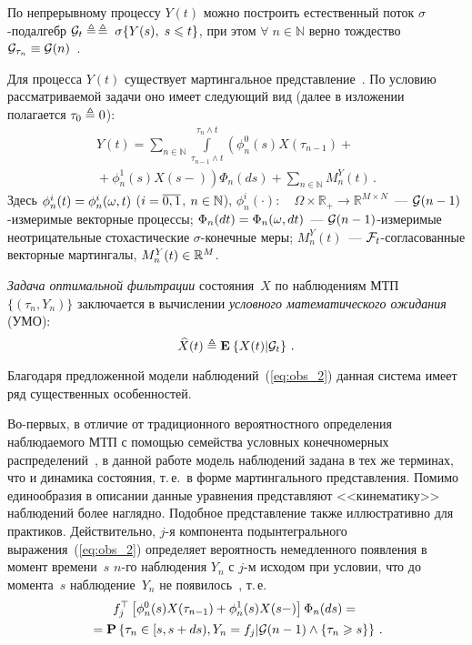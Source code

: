 \begin{multicols}{2}
  По непрерывному процессу $Y(t)$ можно построить естественный поток
  $\sigma$-под\-алгебр ${\mathcal G}_t \triangleq$\linebreak $\ebd\;\sigma\{Y(s), \; s \hm\leqslant t\}$,
  при этом $\forall \; n \in \mathbb{N}$ верно тож\-де\-ст\-во ${\mathcal G}_{\tau_n}
  \equiv {\mathcal G}(n)$~\cite{JSh_94}.

 Для процесса $Y(t)$ существует мартингальное представление~\cite{El_86}.
 По условию рассматриваемой задачи оно имеет следующий вид (далее в изложении
 полагается $\tau_0\hm \ebd 0$):
 \begin{multline}
 Y(t) = \sum\limits_{n \in \mathbb{N}}\int\limits_{\tau_{n-1} \wedge t}^{\tau_{n}
 \wedge t}  \left(
 \phi^0_{n}(s)X(\tau_{n-1})+{}\right.\\
\left. {}+\phi^1_{n}(s)X(s-)
 \right)\Phi_{n}(ds)
 +\sum\limits_{n \in \mathbb{N}}M^Y_n(t)\,.
 \label{eq:obs_2}
 \end{multline}
 Здесь
 $\phi^i_{n}(t)\hm=\phi^i_{n}(\omega,t)$ ($i\hm=\overline{0,1}$, $n \hm
  \in \mathbb{N}$), $\phi^i_{n}(\cdot): \quad \Omega \times \mathbb{R}_+
  \to \mathbb{R}^{M \times N}$~--- ${\mathcal G}(n-1)$-из\-ме\-ри\-мые векторные процессы;
$\Phi_{n}(dt)\hm=\Phi_{n}(\omega,dt)$~--- ${\mathcal G}(n-1)$-из\-ме\-ри\-мые
  не\-от\-ри\-ца\-тель\-ные стохастические $\sigma$-ко\-неч\-ные меры;
$M^Y_n(t)$~--- ${\mathcal F}_t$-со\-гла\-со\-ван\-ные
  векторные мартингалы, $M^Y_n(t) \hm\in \mathbb{R}^{M}$.

\textit{Задача оптимальной фильтрации} состояния~$X$ по наблюдениям
МТП $\{(\tau_n,Y_n)\}$ заключается в вычислении \textit{условного математического
ожидания} (УМО):
 $$
 \widehat{X}(t) \triangleq \mathbf{E}_{  }\left\{ \mathop{X(t)|{\mathcal G}_t} \right\}\,.
 $$


 Благодаря предложенной модели наблюдений~(\ref{eq:obs_2}) данная сис\-те\-ма
 имеет ряд существенных особенностей.

 Во-пер\-вых, в отличие от традиционного
 вероятностного определения наблюдаемого МТП с \mbox{помощью} семейства условных
 конечномерных распределений~\cite{LS_86}, в данной работе модель наблюдений
 задана в тех же терминах, что и динамика состояния, т.\,е.\ в форме мартингального
 пред\-став\-ле\-ния. Помимо единообразия в описании данные уравнения представляют
 <<кинематику>> наблюдений более наглядно. Подобное представление
 также иллюстративно для практиков. Действительно, $j$-я компонента
 подынтегрального выражения~(\ref{eq:obs_2}) определяет вероятность
 немедленного появления в момент времени~$s$ $n$-го наблюдения $Y_n$ с $j$-м
 исходом при условии, что до момента~$s$ наблюдение~$Y_n$ не появилось~\cite{El_86},
 т.\,е.\
\begin{multline*}
 f^{\top}_j\left[
 \phi^0_{n}(s)X(\tau_{n-1})+\phi^1_{n}(s)X(s-)
 \right]\Phi_{n}(ds) = {}\\
 {}={\mathbf P}\left\{\tau_{n} \in [s,s+ds),Y_n=f_j | {\mathcal G}(n-1)\wedge
 \left\{\tau_{n}\geqslant s\right\}\right\}\,.
 \end{multline*}


\end{multicols}
